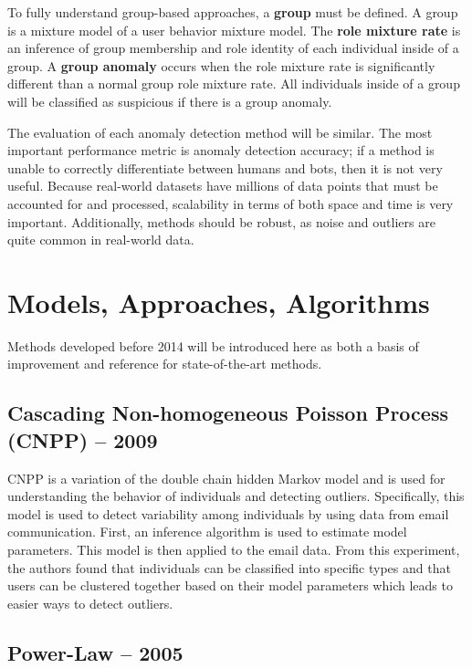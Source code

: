 \documentclass[11pt, oneside]{article}   	%
\begin{document}
\quad To fully understand group-based approaches, a \textbf{group} must be defined.
A group is a mixture model of a user behavior mixture model.
The \textbf{role mixture rate} is an inference of group membership and role identity of each individual inside of a group.
A \textbf{group anomaly} occurs when the role mixture rate is significantly different than a normal group role mixture rate.
All individuals inside of a group will be classified as suspicious if there is a group anomaly.

\quad The evaluation of each anomaly detection method will be similar.
The most important performance metric is anomaly detection accuracy; if a method is unable to correctly differentiate between humans and bots, then it is not very useful.
Because real-world datasets have millions of data points that must be accounted for and processed, scalability in terms of both space and time is very important.
Additionally, methods should be robust, as noise and outliers are quite common in real-world data.

\section*{Models, Approaches, Algorithms}

\quad Methods developed before 2014 will be introduced here as both a basis of improvement and reference for state-of-the-art methods. 

\subsection*{Cascading Non-homogeneous Poisson Process (CNPP) -- 2009}

\quad CNPP is a variation of the double chain hidden Markov model and is used for understanding the behavior of individuals and detecting outliers.
Specifically, this model is used to detect variability among individuals by using data from email communication.
First, an inference algorithm is used to estimate model parameters. 
This model is then applied to the email data.
From this experiment, the authors found that individuals can be classified into specific types and that users can be clustered together based on their model parameters which leads to easier ways to detect outliers.

\subsection*{Power-Law -- 2005}
\end{document}
